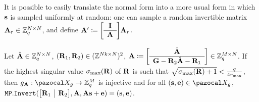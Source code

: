 {  \begin{remark}
    It is possible to easily translate the normal form into a more usual form in which $\mathbf{s}$ is sampled uniformly at random: one can sample a random invertible matrix $\mathbf{A}_r \in \mathbb{Z}_q^{N \times N}$, and define $\vect{A}' \eqdef \SmallBlockMatrix{\vect{I}}{\vect{A}}\vect{A}_r$.
  \end{remark}

  \begin{lemmaE}[][]\label{lem:MPInjectiveSingularValue}
    Let $\hat{\mathbf{A}} \in \mathbb{Z}_q^{N \times N}$, $(\mathbf{R}_1,\mathbf{R}_2) \in (\mathbb{Z}^{Nk \times N})^2$, $\vect{A} \eqdef \SmallBlockMatrix{\hat{\vect{A}}}{\vect{G} - \vect{R}_2\hat{\vect{A}} - \vect{R}_1} \in \Z_q^{M \times N}$. If the highest singular value $\sigma_{\max}(\mathbf{R})$ of $\mathbf{R}$ is such that $\sqrt{\sigma_{\max}(\mathbf{R})+1} < \frac{q}{4 r_{\max}}$, then $g_{\vect{A}}: \cX_g \rightarrow  \Z_q^M$ is injective and for all $(\vect{s},\vect{e}) \in \cX_g$, $\MPDec(\HorizBlockMatrix{\vect{R}_1}{\vect{R}_2}, \vect{A}, \vect{A}\vect{s} + \vect{e}) = (\vect{s}, \vect{e})$.


\end{lemmaE}}
